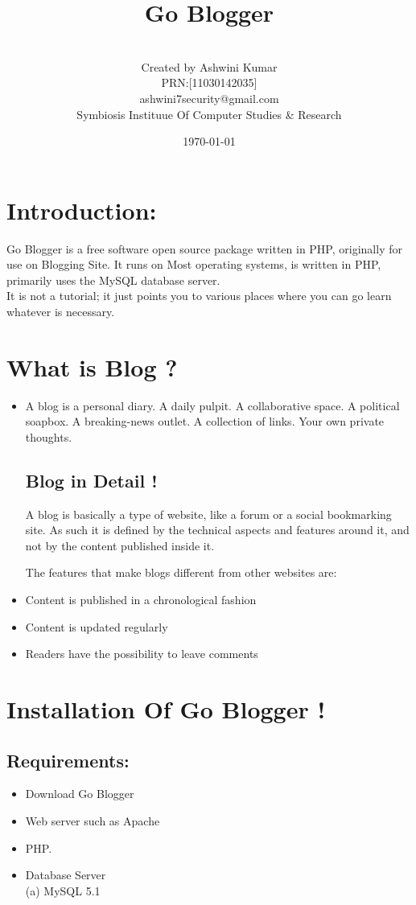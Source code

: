 \documentclass{article}
\title{Go Blogger}
\author{ {\sc }\\Created by Ashwini Kumar\\PRN:[11030142035]\\ashwini7security@gmail.com
\\Symbiosis Instituue Of Computer Studies \& Research\\}
\date{\today}
\begin{document}
\maketitle
\section{\bf Introduction:}
Go Blogger is a free software open source  package written in PHP, originally for use on Blogging Site.  It runs on Most operating systems, is written in PHP, primarily uses the MySQL database server.\\

 It is not a tutorial; it just points you to various places where you can go learn whatever is necessary. \\


\section{\bf What is Blog ?}
\begin{itemize}
 \item A blog is a personal diary. A daily pulpit. A collaborative space. A political soapbox. A breaking-news outlet. A collection of links. Your own private thoughts. 
\subsection{Blog in Detail !}
A blog is basically a type of website, like a forum or a social bookmarking site. As such it is defined by the technical aspects and features around it, and not by the content published inside it.

The features that make blogs different from other websites are:

\item Content is published in a chronological fashion
\item Content is updated regularly
\item Readers have the possibility to leave comments
\end{itemize}

\section{Installation Of Go Blogger !}

\subsection {\bf Requirements:} 
\begin{itemize}
\item Download Go Blogger \\
\item Web server such as Apache\\
\item PHP. 
\item Database Server \\
(a) MySQL 5.1 
\end{itemize}
\end{document}
